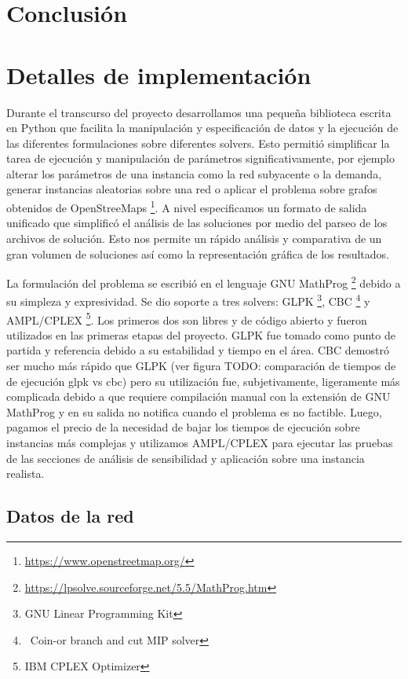 \documentclass{article}
\begin{document}

  \section{Conclusión}


  \section{Detalles de implementación}

  Durante el transcurso del proyecto desarrollamos una pequeña biblioteca escrita en Python que facilita la manipulación y especificación de datos y la ejecución de las diferentes formulaciones sobre diferentes solvers. Esto permitió simplificar la tarea de ejecución y manipulación de parámetros significativamente, por ejemplo alterar los parámetros de una instancia como la red subyacente o la demanda, generar instancias aleatorias sobre una red o aplicar el problema sobre grafos obtenidos de OpenStreeMaps \footnote{\url{https://www.openstreetmap.org/}}. A nivel especificamos un formato de salida unificado que simplificó el análisis de las soluciones por medio del parseo de los archivos de solución. Esto nos permite un rápido análisis y comparativa de un gran volumen de soluciones así como la representación gráfica de los resultados.

  La formulación del problema se escribió en el lenguaje GNU MathProg \footnote{\url{https://lpsolve.sourceforge.net/5.5/MathProg.htm}} debido a su simpleza y expresividad. Se dio soporte a tres solvers: GLPK \footnote{GNU Linear Programming Kit}, CBC \footnote{\ Coin-or branch and cut MIP solver} y AMPL/CPLEX \footnote{IBM CPLEX Optimizer}. Los primeros dos son libres y de código abierto y fueron utilizados en las primeras etapas del proyecto. GLPK fue tomado como punto de partida y referencia debido a su estabilidad y tiempo en el área. CBC demostró ser mucho más rápido que GLPK (ver figura TODO: comparación de tiempos de de ejecución glpk vs cbc) pero su utilización fue, subjetivamente, ligeramente más complicada debido a que requiere compilación manual con la extensión de GNU MathProg y en su salida no notifica cuando el problema es no factible. Luego, pagamos el precio de la necesidad de bajar los tiempos de ejecución sobre instancias más complejas y utilizamos AMPL/CPLEX para ejecutar las pruebas de las secciones de análisis de sensibilidad y aplicación sobre una instancia realista.

  \subsection{Datos de la red}
\end{document}
